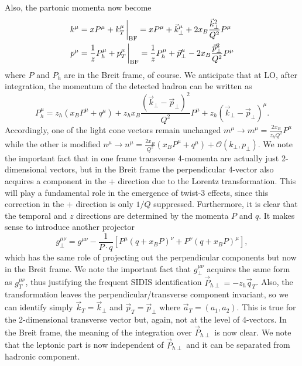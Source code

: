 Also, the partonic momenta now become
\begin{equation}\label{eq:partonic momenta in BF}
    \begin{aligned}
        k^\mu&=xP^\mu+k_T^\mu\eval_{\text{BF}}=x P^\mu+\vec k_\perp^\mu+2x_B\frac{\vec k_\perp^2}{Q^2}P^\mu\\
        p^\mu&=\frac{1}{z}P_h^\mu+p_T^\mu\eval_{\text{BF}}=\frac{1}{z}P_h^\mu+\vec p_\perp^\mu-2x_B\frac{\vec p_\perp^2}{Q^2}P^\mu
    \end{aligned}
\end{equation}
where $P$ and $P_h$ are in the Breit frame, of course. We anticipate that at LO, after integration, the momentum of the detected hadron can be written as
\begin{equation}
    P_h^\mu= z_h(x_BP^\mu+q^\mu)+z_hx_B\frac{(\vec k_\perp - \vec p_\perp)^2}{Q^2}P^\mu+z_h(\vec k_\perp-\vec p_\perp)^\mu.
\end{equation}
Accordingly, one of the light cone vectors remain unchanged $m ^\mu\to m^\mu=\frac{2x_B}{z_hQ^2}P^\mu$ while the other is modified $n^\mu\to n^\mu=\frac{2x_B}{Q^2}(x_BP^\mu+q^\mu)+\mathcal{O}(k_\perp,p_\perp)$. We note the important fact that in one frame transverse 4-momenta are actually just 2-dimensional vectors, but in the Breit frame the perpendicular 4-vector also acquires a component in the + direction due to the Lorentz transformation. This will play a fundamental role in the emergence of twist-3 effects, since this correction in the + direction is only $1/Q$ suppressed. Furthermore, it is clear that the temporal and $z$ directions are determined by the momenta $P$ and $q$. It makes sense to introduce another projector 
\begin{equation}
    g_\perp^{\mu\nu}=g^{\mu\nu}-\frac{1}{P\cdot q}[P^\mu(q+x_BP)^\nu + P^\nu(q+x_BP)^\mu],
\end{equation}
which has the same role of projecting out the perpendicular components but now in the Breit frame. We note the important fact that $g_\perp^{\mu\nu}$ acquires the same form as $g_T^{\mu\nu}$, thus justifying the frequent SIDIS identification $\vec P_{h\perp}=-z_h\vec q_T$. Also, the transformation leaves the perpendicular/transverse component invariant, so we can identify simply $\vec k_T=\vec k_\perp$ and $\vec p_T =\vec p_\perp$ where $\vec a_T=(a_1,a_2)$. This is true for the 2-dimensional transverse vector but, again, not at the level of 4-vectors. In the Breit frame, the meaning of the integration over $\vec P_{h\perp}$ is now clear. We note that the leptonic part is now independent of $\vec P_{h\perp}$ and it can be separated from hadronic component.

